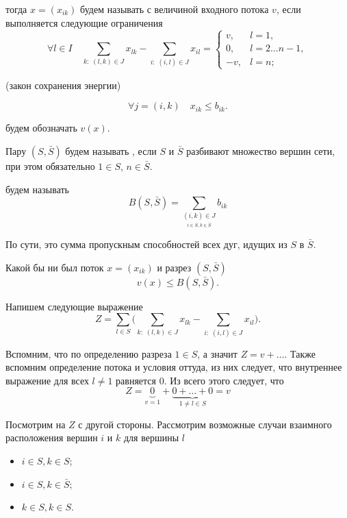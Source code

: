 тогда $x = (x_{ik})$ будем называть  с величиной входного потока $v$, если выполняется следующие ограничения
\[
\forall l \in I \quad \sum_{k:\;(l, k) \in J} x_{lk} - \sum_{i: \; (i, l) \in J} x_{il} = \begin{cases}
	v, & l = 1, \\
	0, & l = 2 \dots n-1, \\
	-v, & l = n;
\end{cases}
\]

(закон сохранения энергии)

\[
\forall j = (i, k) \quad x_{ik} \le b_{ik}.
\]


 будем обозначать $v(x)$.


Пару $(S, \bar{S})$ будем называть , если $S$ и $\bar{S}$ разбивают множество вершин сети, при этом обязательно $1 \in S$, $n \in \bar{S}$.


 будем называть
\[
B(S, \bar{S}) = \sum_{\underset{i \in S, k \in \bar{S}}{(i, k) \in J}} b_{ik}
\]

По сути, это сумма пропускным способностей всех дуг, идущих из $S$ в $\bar{S}$.


Какой бы ни был поток $x = (x_{ik})$ и разрез $(S, \bar{S})$
\[
v(x) \le B(S, \bar{S}).
\]

\prooof

Напишем следующие выражение
\[
Z = \sum_{l \in S} \bigg(\sum_{k:\;(l, k) \in J} x_{lk} - \sum_{i: \; (i, l) \in J} x_{il}\bigg).
\]

Вспомним, что по определению разреза $1 \in S$, а значит $Z = v + \dots$. Также вспомним определение потока и условия оттуда, из них следует, что внутреннее выражение для всех $l \neq 1$ равняется $0$. Из всего этого следует, что
\[
Z = \underbrace{0}_{v = 1} + \underbrace{0 + \dots + 0}_{1 \neq l \in S} = v
\]

Посмотрим на $Z$ с другой стороны. Рассмотрим возможные случаи взаимного расположения вершин $i$ и $k$ для вершины $l$

\begin{itemize}[nosep]
	\item $i \in S, k \in S$;
	
	\item $i \in S, k \in \bar{S}$;
	
	\item $k \in S, k \in S$.
\end{itemize}

